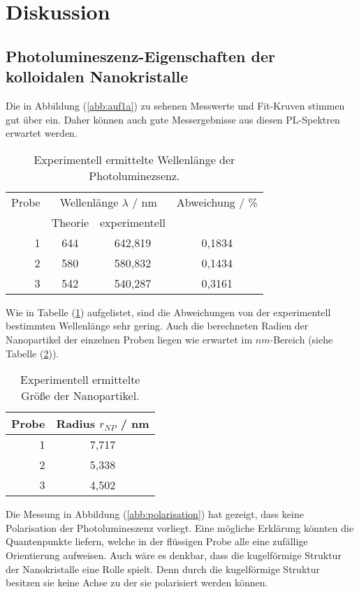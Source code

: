 \section{Diskussion}
\subsection{Photolumineszenz-Eigenschaften der kolloidalen Nanokristalle}
Die in Abbildung (\ref{abb:auf1a}) zu sehenen Messwerte und Fit-Kruven stimmen gut \"{u}ber ein.
Daher k\"{o}nnen auch gute Messergebnisse aus diesen PL-Spektren erwartet werden.
\begin{table}
	\centering
	\caption{Experimentell ermittelte Wellenl\"{a}nge der Photoluminezsenz.}
\begin{tabular}{|r|ccc|}
	\hline
	{Probe} & \multicolumn{2}{c}{Wellenl\"{a}nge $\lambda$ / nm} & {Abweichung / \%} \\
	 & Theorie & experimentell &  \\
	\hline
	1	&	644	& 642,819 &	0,1834 \\
	2	&	580	& 580,832 &	0,1434 \\
	3	&	542	& 540,287 &	0,3161 \\
	\hline
\end{tabular}
\label{tab:disku1}
\end{table}
Wie in Tabelle (\ref{tab:disku1}) aufgelistet, sind die Abweichungen von der experimentell bestimmten Wellenl\"{a}nge sehr gering.
Auch die berechneten Radien der Nanopartikel der einzelnen Proben liegen wie erwartet im $nm$-Bereich (siehe Tabelle (\ref{tab:disku2})).
\begin{table}
	\centering
	\caption{Experimentell ermittelte Gr\"{o}{\ss}e der Nanopartikel.}
\begin{tabular}{|r|c|}
	\hline
	{Probe} & {Radius $r_{NP}$ / nm} \\
	\hline
	1	&	7,717	\\
	2	&	5,338	\\
	3	&	4,502	\\
	\hline
\end{tabular}
\label{tab:disku2}
\end{table}

\bigskip
Die Messung in Abbildung (\ref{abb:polarisation}) hat gezeigt, dass keine Polarisation der Photolumineszenz vorliegt.
Eine m\"{o}gliche Erkl\"{a}rung k\"{o}nnten die Quantenpunkte liefern, welche in der fl\"{u}ssigen Probe alle eine zuf\"{a}llige Orientierung aufweisen.
Auch w\"{a}re es denkbar, dass die kugelf\"{o}rmige Struktur der Nanokristalle eine Rolle spielt.
Denn durch die kugelf\"{o}rmige Struktur besitzen sie keine Achse zu der sie polarisiert werden k\"{o}nnen.

